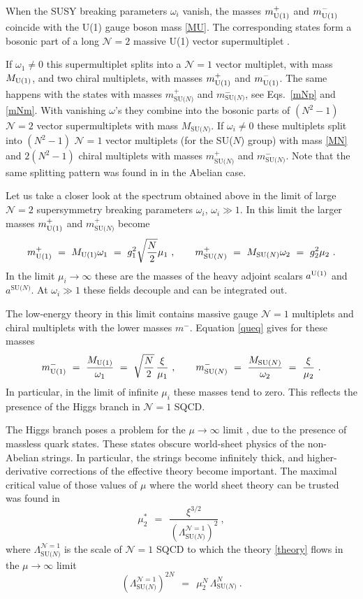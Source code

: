 \documentclass[12pt]{article}
\def\beq{\begin{equation}}
\def\eeq{\end{equation}}
\newcommand{\ntwo}{${\mathcal N}=2$ }
\newcommand{\none}{${\mathcal N}=1$ }
\newcommand{\mc}[1]{\mathcal{#1}}
\newcommand{\LN}{\Lambda_\text{SU($N$)}}
\newcommand{\mUp}{m_{\rm U(1)}^{+}}
\newcommand{\mUm}{m_{\rm U(1)}^{-}}
\newcommand{\mNp}{m_\text{SU($N$)}^{+}}
\newcommand{\mNm}{m_\text{SU($N$)}^{-}}
\newcommand{\aU}{a^{\rm U(1)}}
\newcommand{\aN}{a^\text{SU($N$)}}
\newcommand{\MN}{M_\text{SU($N$)}}
\newcommand{\MU}{M_{\rm U(1)}}
\begin{document}
	When the SUSY breaking parameters $ \omega_i $ vanish, the masses $ \mUp $ and $ \mUm $
	coincide with the U(1) gauge boson mass \eqref{MU}.
	The corresponding states form a bosonic part of a long \ntwo massive U(1) vector supermultiplet
	\cite{VY}.	

	If $\omega_1 \neq 0 $ this supermultiplet splits into a \none vector multiplet, with mass $ \MU $,
	and two chiral multiplets, with masses $ \mUp $ and $ \mUm $. 
	The same happens with the states with masses $ \mNp $ and $ \mNm $, see Eqs.~\eqref{mNp} and  \eqref{mNm}.
	With vanishing $ \omega $'s they combine into the bosonic parts of $ (N^2 - 1) $ \ntwo vector supermultiplets
	with mass $ \MN $.
	If $ \omega_i \neq 0 $ these multiplets split into $ (N^2 - 1) $ \none vector multiplets (for the 
	SU($N$) group) with mass \eqref{MN} and $ 2(N^2 - 1) $ chiral multiplets with masses 
	$ \mNp $ and $ \mNm $.
	Note that the same splitting pattern was found in \cite{VY} in the Abelian case.

	Let us take a closer look at the spectrum obtained above in the limit of large \ntwo supersymmetry 
	breaking parameters $\omega_i$, $\omega_i \gg 1 $.
	In this limit the larger masses $ \mUp $ and $\mNp$ become
\beq
\label{amass}
	\mUp ~=~ \MU \omega_1 ~=~ g_1^2\sqrt{\frac{N}{2}}\mu_1 ~,
	\qquad
	\mNp ~=~ \MN \omega_2 ~=~ g_2^2 \mu_2~.
\eeq
	In the limit $\mu_i \to \infty$ these are the masses of the heavy adjoint scalars $ \aU $ and
	$ \aN $.
	At $ \omega_i \gg 1 $ these fields decouple and can be integrated out.

	The low-energy theory in this limit contains massive gauge \none multiplets and chiral multiplets
	with the lower masses $ m^- $. 
	Equation \eqref{queq} gives for these masses
\beq
\label{light}
	\mUm ~=~ \frac{\MU}{\omega_1} ~=~ \sqrt{\frac{N}{2}}\, \frac{\xi}{\mu_1}~,
	\qquad
	\mNm ~=~ \frac{\MN}{\omega_2} ~=~ \frac{\xi}{\mu_2}~.
\eeq
	In particular, in the limit of infinite $ \mu_i $ these masses tend to zero. 
	This reflects the presence of the Higgs branch in \none SQCD.

	The Higgs branch poses a problem for the $ \mu \to \infty $ limit \cite{SYnone},
	due to the presence of massless quark states.
	These states obscure world-sheet physics of the non-Abelian strings. 
	In particular, the strings become infinitely thick, and higher-derivative corrections
	of the effective theory become important.
	The maximal critical value of those values of $ \mu $ where the world sheet theory can be 
	trusted was found in \cite{SYnone}
\[
	\mu_2^* ~~=~~ \frac{\xi^{3/2}}{\left(\Lambda_\text{SU($N$)}^{\mc{N}=1}\right)^2}~,
\]
	where $ \Lambda_\text{SU($N$)}^{\mc{N}=1} $ is the scale of \none SQCD to which the theory
	\eqref{theory} flows in the $ \mu \to \infty $ limit
\[
	\left(\Lambda_\text{SU($N$)}^{\mc{N}=1}\right)^{2N} ~~=~~ \mu_2^N\, \LN^N~.
\]
\end{document}
